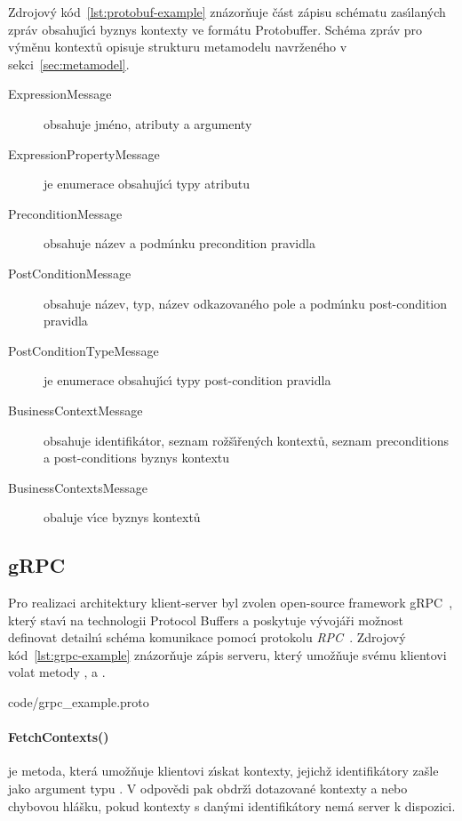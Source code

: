 Zdrojov\'y kód~\ref{lst:protobuf-example} znázorňuje část zápisu schématu
zas\'{\i}lan\'ych zpráv obsahuj\'{\i}c\'{\i} byznys kontexty ve formátu Protobuffer.
Schéma zpráv pro v\'yměnu kontextů opisuje strukturu metamodelu navrženého
v sekci~\ref{sec:metamodel}.

\begin{description}
    \item [ExpressionMessage] obsahuje jméno, atributy a argumenty 
    \item [ExpressionPropertyMessage] je enumerace obsahuj\'{\i}c\'{\i} typy atributu 
    \item [PreconditionMessage] obsahuje název a podm\'{\i}nku precondition pravidla
    \item [PostConditionMessage] obsahuje název, typ, název odkazovaného pole a podm\'{\i}nku post-condition pravidla
    \item [PostConditionTypeMessage] je enumerace obsahuj\'{\i}c\'{\i} typy post-condition pravidla
    \item [BusinessContextMessage] obsahuje identifikátor, seznam rožš\'{\i}řen\'ych kontextů, seznam preconditions a post-conditions byznys kontextu
    \item [BusinessContextsMessage] obaluje v\'{\i}ce byznys kontextů
\end{description}

\subsection{gRPC}

Pro realizaci architektury klient-server byl zvolen
open-source framework gRPC~\cite{grpcio}, kter\'y stav\'{\i}
na technologii Protocol Buffers a poskytuje v\'yvojáři
možnost definovat detailn\'{\i} schéma komunikace pomoc\'{\i}
protokolu \textit{\gls{RPC}}~\cite{nelson1981remote}.
Zdrojov\'y kód~\ref{lst:grpc-example} znázorňuje zápis serveru,
kter\'y umožňuje svému klientovi volat metody ,
 a .


{code/grpc_example.proto}

\paragraph{FetchContexts()} je metoda, která umožňuje klientovi
z\'{\i}skat kontexty, jejichž identifikátory zašle jako argument
typu .
V odpovědi pak obdrž\'{\i} dotazované kontexty a nebo chybovou hlášku,
pokud kontexty s dan\'ymi identifikátory nemá server k dispozici.

